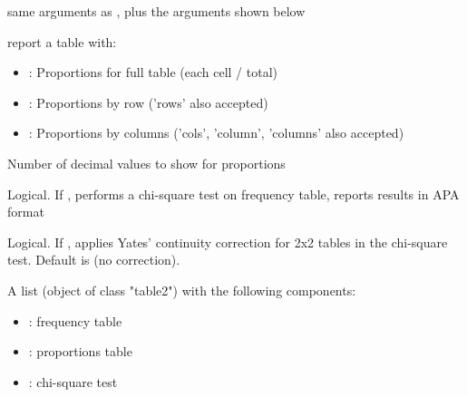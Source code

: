 \documentclass[a4paper]{book}
\begin{document}
%
\begin{Arguments}
\begin{ldescription}
\item[\code{...}] same arguments as , plus the arguments shown below

\item[\code{prop}] report a table with:
\begin{itemize}

\item{} : Proportions for full table (each cell / total)
\item{} : Proportions by row  ('rows' also accepted)
\item{} : Proportions by columns ('cols', 'column', 'columns' also accepted)

\end{itemize}


\item[\code{digits}] Number of decimal values to show for proportions

\item[\code{chi}] Logical. If , performs a chi-square test on frequency table,
reports results in APA format

\item[\code{correct}] Logical. If , applies Yates' continuity correction 
for 2x2 tables in the chi-square test. Default is  (no correction).
\end{ldescription}
\end{Arguments}
%
\begin{Value}
A list (object of class "table2") with the following components:
\begin{itemize}

\item{} : frequency table 
\item{} : proportions table 
\item{} : chi-square test  

\end{itemize}

\end{Value}
%
\end{document}
